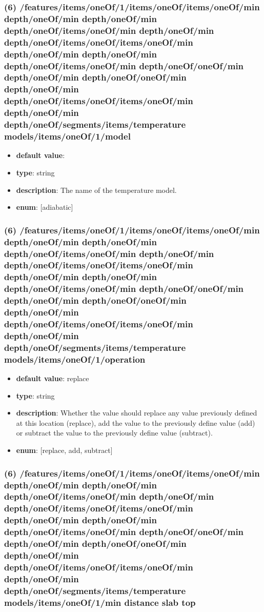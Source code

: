 \subsubsection{(6) /features/items/oneOf/1/items/oneOf/items/oneOf/min depth/oneOf/min depth/oneOf/min depth/oneOf/items/oneOf/min depth/oneOf/min depth/oneOf/items/oneOf/items/oneOf/min depth/oneOf/min depth/oneOf/min depth/oneOf/items/oneOf/min depth/oneOf/oneOf/min depth/oneOf/min depth/oneOf/oneOf/min depth/oneOf/min depth/oneOf/items/oneOf/items/oneOf/min depth/oneOf/min depth/oneOf/segments/items/temperature models/items/oneOf/1/model}
\begin{itemize}[leftmargin=6em]\item {\bf default value}: 
\item {\bf type}: string
\item {\bf description}: The name of the temperature model.
\item {\bf enum}: [adiabatic]\end{itemize}\subsubsection{(6) /features/items/oneOf/1/items/oneOf/items/oneOf/min depth/oneOf/min depth/oneOf/min depth/oneOf/items/oneOf/min depth/oneOf/min depth/oneOf/items/oneOf/items/oneOf/min depth/oneOf/min depth/oneOf/min depth/oneOf/items/oneOf/min depth/oneOf/oneOf/min depth/oneOf/min depth/oneOf/oneOf/min depth/oneOf/min depth/oneOf/items/oneOf/items/oneOf/min depth/oneOf/min depth/oneOf/segments/items/temperature models/items/oneOf/1/operation}
\begin{itemize}[leftmargin=6em]\item {\bf default value}: replace
\item {\bf type}: string
\item {\bf description}: Whether the value should replace any value previously defined at this location (replace), add the value to the previously define value (add) or subtract the value to the previously define value (subtract).
\item {\bf enum}: [replace, add, subtract]\end{itemize}\subsubsection{(6) /features/items/oneOf/1/items/oneOf/items/oneOf/min depth/oneOf/min depth/oneOf/min depth/oneOf/items/oneOf/min depth/oneOf/min depth/oneOf/items/oneOf/items/oneOf/min depth/oneOf/min depth/oneOf/min depth/oneOf/items/oneOf/min depth/oneOf/oneOf/min depth/oneOf/min depth/oneOf/oneOf/min depth/oneOf/min depth/oneOf/items/oneOf/items/oneOf/min depth/oneOf/min depth/oneOf/segments/items/temperature models/items/oneOf/1/min distance slab top}

